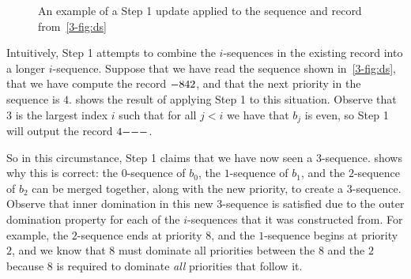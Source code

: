\begin{figure}[!ht]
    \begin{center}
    \end{center}
    \caption{An example of a Step 1 update applied to the sequence and record from~\cref{3-fig:ds}}
\label{3-fig:ds1}
\end{figure}
Intuitively, Step 1 attempts to combine the $i$-sequences in the existing record
into a longer $i$-sequence. Suppose that we have read the sequence shown in~\cref{3-fig:ds}, 
that we have compute the record $\mathtt{-} 8 4 2$, and that the next priority in the sequence is $4$.
 shows the result of applying Step 1 to this situation.
Observe that $3$ is the largest index $i$ such that for all $j < i$ we have that
$b_j$ is even, so Step 1 will output the record $4 \mathtt{-} \mathtt{-} \mathtt{-}$.

So in this circumstance, Step 1 claims that we have now seen a $3$-sequence.
 shows why this is correct: the $0$-sequence of $b_0$, the
$1$-sequence of $b_1$, and the $2$-sequence of $b_2$ can be merged together,
along with the new priority, to create a $3$-sequence. Observe that inner
domination in this new $3$-sequence is satisfied due to the outer domination
property for each of the $i$-sequences that it was constructed from.
For example, the $2$-sequence ends at priority $8$, and the $1$-sequence begins
at priority $2$, and we know that $8$ must dominate all priorities between the
$8$ and the $2$ because $8$ is required to dominate \emph{all} priorities that
follow it.

